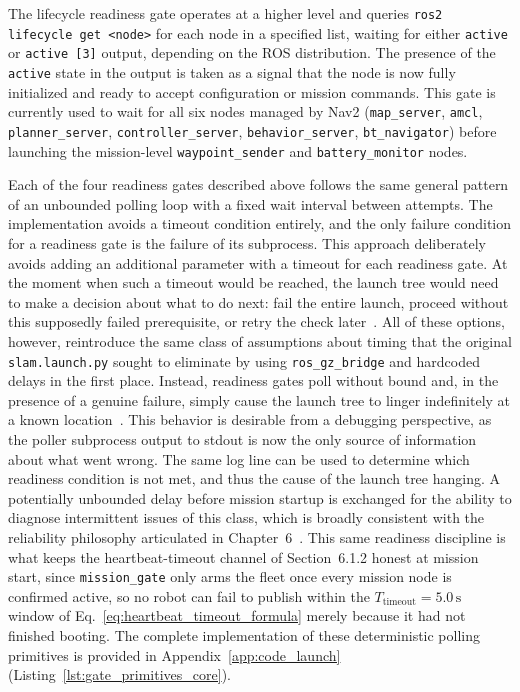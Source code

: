 The lifecycle readiness gate operates at a higher level and queries \texttt{ros2 lifecycle get <node>} for each node in a specified list, waiting for either \texttt{active} or \texttt{active~[3]} output, depending on the ROS distribution. The presence of the \texttt{active} state in the output is taken as a signal that the node is now fully initialized and ready to accept configuration or mission commands. This gate is currently used to wait for all six nodes managed by Nav2 (\texttt{map\_server}, \texttt{amcl}, \texttt{planner\_server}, \texttt{controller\_server}, \texttt{behavior\_server}, \texttt{bt\_navigator}) before launching the mission-level \texttt{waypoint\_sender} and \texttt{battery\_monitor} nodes.

Each of the four readiness gates described above follows the same general pattern of an unbounded polling loop with a fixed wait interval between attempts. The implementation avoids a timeout condition entirely, and the only failure condition for a readiness gate is the failure of its subprocess. This approach deliberately avoids adding an additional parameter with a timeout for each readiness gate. At the moment when such a timeout would be reached, the launch tree would need to make a decision about what to do next: fail the entire launch, proceed without this supposedly failed prerequisite, or retry the check later~\cite{blass2021automatic}. All of these options, however, reintroduce the same class of assumptions about timing that the original \texttt{slam.launch.py} sought to eliminate by using \texttt{ros\_gz\_bridge} and hardcoded delays in the first place. Instead, readiness gates poll without bound and, in the presence of a genuine failure, simply cause the launch tree to linger indefinitely at a known location~\cite{lampe2023robotkube}. This behavior is desirable from a debugging perspective, as the poller subprocess output to stdout is now the only source of information about what went wrong. The same log line can be used to determine which readiness condition is not met, and thus the cause of the launch tree hanging. A potentially unbounded delay before mission startup is exchanged for the ability to diagnose intermittent issues of this class, which is broadly consistent with the reliability philosophy articulated in Chapter~6~\cite{lampe2023robotkube}. This same readiness discipline is what keeps the heartbeat-timeout channel of Section~6.1.2 honest at mission start, since \texttt{mission\_gate} only arms the fleet once every mission node is confirmed active, so no robot can fail to publish within the $T_{\text{timeout}} = 5.0\,\text{s}$ window of Eq.~\eqref{eq:heartbeat_timeout_formula} merely because it had not finished booting. The complete implementation of these deterministic polling primitives is provided in Appendix~\ref{app:code_launch} (Listing~\ref{lst:gate_primitives_core}).

